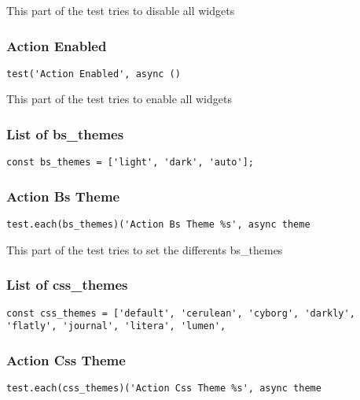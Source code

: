 \documentclass[a4paper]{article}
\begin{document}
This part of the test tries to disable all widgets

\hypertarget{toc272}{}
\subsubsection{Action Enabled}

\begin{lstlisting}
test('Action Enabled', async ()
\end{lstlisting}

This part of the test tries to enable all widgets

\hypertarget{toc273}{}
\subsubsection{List of bs\_themes}

\begin{lstlisting}
const bs_themes = ['light', 'dark', 'auto'];
\end{lstlisting}

\hypertarget{toc274}{}
\subsubsection{Action Bs Theme}

\begin{lstlisting}
test.each(bs_themes)('Action Bs Theme %s', async theme
\end{lstlisting}

This part of the test tries to set the differents bs\_themes

\hypertarget{toc275}{}
\subsubsection{List of css\_themes}

\begin{lstlisting}
const css_themes = ['default', 'cerulean', 'cyborg', 'darkly', 'flatly', 'journal', 'litera', 'lumen',
\end{lstlisting}

\hypertarget{toc276}{}
\subsubsection{Action Css Theme}

\begin{lstlisting}
test.each(css_themes)('Action Css Theme %s', async theme
\end{lstlisting}
\end{document}
